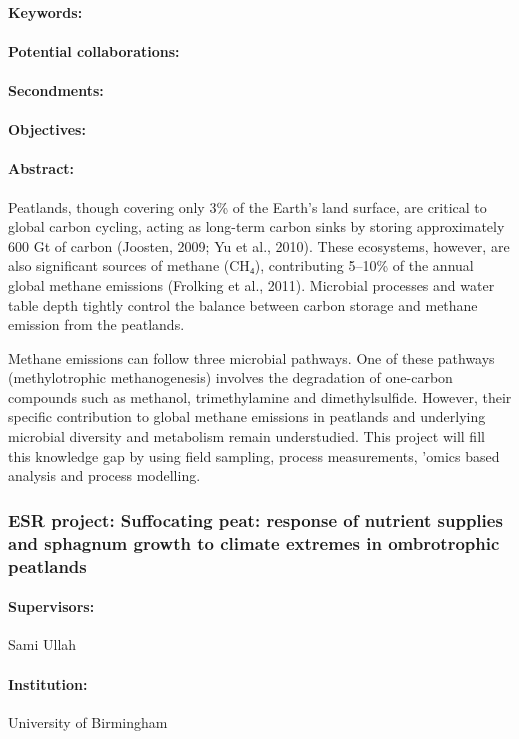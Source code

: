 \documentclass[12pt]{article}
\begin{document}
\paragraph{Keywords:} 
\paragraph{Potential collaborations:} 
\paragraph{Secondments:} 
\paragraph{Objectives:} 
\paragraph{Abstract:} Peatlands, though covering only 3\% of the Earth's land surface, are critical to global carbon cycling, acting as long-term carbon sinks by storing approximately 600 Gt of carbon (Joosten, 2009; Yu et al., 2010). These ecosystems, however, are also significant sources of methane (CH₄), contributing 5–10\% of the annual global methane emissions (Frolking et al., 2011). Microbial processes and water table depth tightly control the balance between carbon storage and methane emission from the peatlands. 

Methane emissions can follow three microbial pathways. One of these pathways (methylotrophic methanogenesis) involves the degradation of one-carbon compounds such as methanol, trimethylamine and dimethylsulfide. However, their specific contribution to global methane emissions in peatlands and underlying microbial diversity and metabolism remain understudied. This project will fill this knowledge gap by using field sampling, process measurements, 'omics based analysis and process modelling.

\subsubsection*{ESR project: Suffocating peat: response of nutrient supplies and sphagnum growth to climate extremes in ombrotrophic peatlands}
\paragraph{Supervisors:} Sami Ullah
\paragraph{Institution:} University of Birmingham
\end{document}
